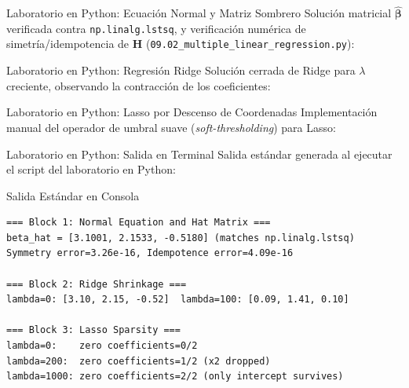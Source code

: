 \documentclass[10pt, aspectratio=169]{beamer}
\begin{document}
\begin{frame}[fragile]{Laboratorio en Python: Ecuación Normal y Matriz Sombrero}
  \scriptsize
  Solución matricial $\hat{\boldsymbol\beta}$ verificada contra \texttt{np.linalg.lstsq}, y verificación numérica de simetría/idempotencia de $\mathbf{H}$ (\texttt{09.02\_multiple\_linear\_regression.py}):
  {
  }
\end{frame}

\begin{frame}[fragile]{Laboratorio en Python: Regresión Ridge}
  \scriptsize
  Solución cerrada de Ridge para $\lambda$ creciente, observando la contracción de los coeficientes:
  {
  }
\end{frame}

\begin{frame}[fragile]{Laboratorio en Python: Lasso por Descenso de Coordenadas}
  \scriptsize
  Implementación manual del operador de umbral suave (\emph{soft-thresholding}) para Lasso:
  {
  }
\end{frame}

\begin{frame}[fragile]{Laboratorio en Python: Salida en Terminal}
  \scriptsize
  Salida estándar generada al ejecutar el script del laboratorio en Python:
  \vspace{0.02cm}
  \begin{block}{Salida Estándar en Consola}
    \fontsize{3.6pt}{4.3pt}\selectfont
    \begin{verbatim}
=== Block 1: Normal Equation and Hat Matrix ===
beta_hat = [3.1001, 2.1533, -0.5180] (matches np.linalg.lstsq)
Symmetry error=3.26e-16, Idempotence error=4.09e-16

=== Block 2: Ridge Shrinkage ===
lambda=0: [3.10, 2.15, -0.52]  lambda=100: [0.09, 1.41, 0.10]

=== Block 3: Lasso Sparsity ===
lambda=0:    zero coefficients=0/2
lambda=200:  zero coefficients=1/2 (x2 dropped)
lambda=1000: zero coefficients=2/2 (only intercept survives)
    \end{verbatim}
  \end{block}
\end{frame}
\end{document}
